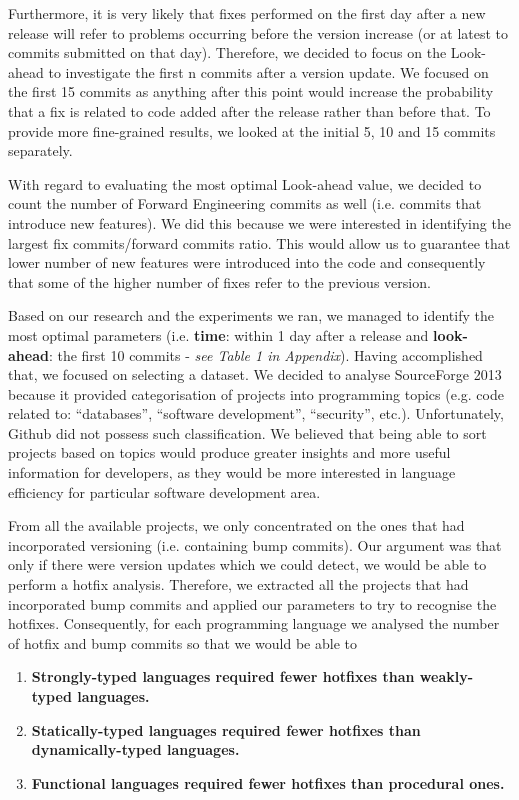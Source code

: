 Furthermore, it is very likely that fixes performed on the first day after a new release will refer to problems occurring before the version increase (or at latest to commits submitted on that day). Therefore, we decided to focus on the Look-ahead to investigate the first n commits after a version update. We focused on the first 15 commits as anything after this point would increase the probability that a fix is related to code added after the release rather than before that. To provide more fine-grained results, we looked at the initial 5, 10 and 15 commits separately.\par

With regard to evaluating the most optimal Look-ahead value, we decided to count the number of Forward Engineering commits as well (i.e. commits that introduce new features). We did this because we were interested in identifying the largest fix commits/forward commits ratio. This would allow us to guarantee that lower number of new features were introduced into the code and consequently that some of the higher number of fixes refer to the previous version.\par

Based on our research and the experiments we ran, we managed to identify the most optimal parameters (i.e. \textbf{time}: within 1 day after a release and \textbf{look-ahead}: the first 10 commits - \textit{see Table 1 in Appendix}). Having accomplished that, we focused on selecting a dataset. We decided to analyse SourceForge 2013 because it provided categorisation of projects into programming topics (e.g. code related to: ``databases'', ``software development'', ``security'', etc.). Unfortunately, Github did not possess such classification. We believed that being able to sort projects based on topics would produce greater insights and more useful information for developers, as they would be more interested in language efficiency for particular software development area.\par

From all the available projects, we only concentrated on the ones that had incorporated versioning (i.e. containing bump commits). Our argument was that only if there were version updates which we could detect, we would be able to perform a hotfix analysis. Therefore, we extracted all the projects that had incorporated bump commits and applied our parameters to try to recognise the hotfixes. Consequently, for each programming language we analysed the number of hotfix and bump commits so that we would be able to 
\begin{enumerate}
\item \textbf{Strongly-typed languages required fewer hotfixes than weakly-typed languages.}
\item \textbf{Statically-typed languages required fewer hotfixes than dynamically-typed languages.}
\item \textbf{Functional languages required fewer hotfixes than procedural ones.}
\end{enumerate}


